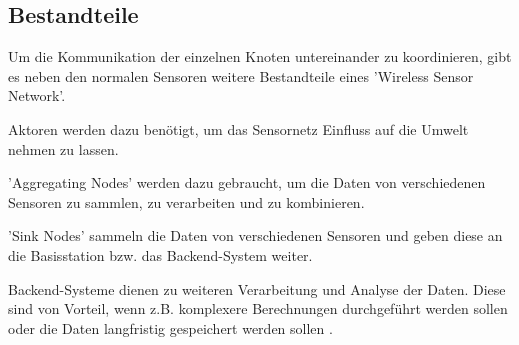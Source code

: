 \subsection{Bestandteile}\label{ss:Bestandteile}

Um die Kommunikation der einzelnen Knoten untereinander zu koordinieren, gibt es neben den normalen Sensoren weitere Bestandteile eines 'Wireless Sensor Network'.

Aktoren werden dazu benötigt, um das Sensornetz Einfluss auf die Umwelt nehmen zu lassen.

'Aggregating Nodes' werden dazu gebraucht, um die Daten von verschiedenen Sensoren zu sammlen, zu verarbeiten und zu kombinieren.

'Sink Nodes' sammeln die Daten von verschiedenen Sensoren und geben diese an die Basisstation bzw. das Backend-System weiter.

Backend-Systeme dienen zu weiteren Verarbeitung und Analyse der Daten.
Diese sind von Vorteil, wenn z.B. komplexere Berechnungen durchgeführt werden sollen oder die Daten langfristig gespeichert werden sollen \cite{d:wolf}.